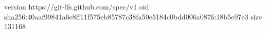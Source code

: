 version https://git-lfs.github.com/spec/v1
oid sha256:40aaf99841a6e8ff11f575eb85787c38fa50e5184c0bdd006a087fc18b5e97e3
size 131168
